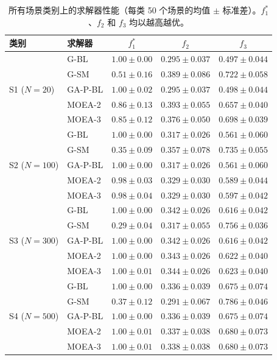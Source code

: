 \documentclass[preprint,12pt,authoryear]{elsarticle}
\begin{document}
\begin{table}[H]
\centering
\small
\caption{所有场景类别上的求解器性能（每类 50 个场景的均值 $\pm$ 标准差）。$f_1^*$、$f_2$ 和 $f_3$ 均以越高越优。}
\label{tab:solver-profiles}
\begin{tabular}{llccc}
\toprule
\textbf{类别} & \textbf{求解器} & $f_1^*$ & $f_2$ & $f_3$ \\
\midrule
\multirow{5}{*}{S1 ($N=20$)}
 & G-BL    & $1.00 \pm 0.00$ & $0.295 \pm 0.037$ & $0.497 \pm 0.044$ \\
 & G-SM    & $0.51 \pm 0.16$ & $0.389 \pm 0.086$ & $0.722 \pm 0.058$ \\
 & GA-P-BL & $1.00 \pm 0.02$ & $0.295 \pm 0.037$ & $0.498 \pm 0.044$ \\
 & MOEA-2  & $0.86 \pm 0.13$ & $0.393 \pm 0.055$ & $0.657 \pm 0.040$ \\
 & MOEA-3  & $0.85 \pm 0.12$ & $0.376 \pm 0.050$ & $0.698 \pm 0.039$ \\
\midrule
\multirow{5}{*}{S2 ($N=100$)}
 & G-BL    & $1.00 \pm 0.00$ & $0.317 \pm 0.026$ & $0.561 \pm 0.060$ \\
 & G-SM    & $0.35 \pm 0.09$ & $0.357 \pm 0.078$ & $0.735 \pm 0.055$ \\
 & GA-P-BL & $1.00 \pm 0.00$ & $0.317 \pm 0.026$ & $0.561 \pm 0.060$ \\
 & MOEA-2  & $0.98 \pm 0.03$ & $0.329 \pm 0.030$ & $0.589 \pm 0.044$ \\
 & MOEA-3  & $0.98 \pm 0.04$ & $0.329 \pm 0.030$ & $0.597 \pm 0.042$ \\
\midrule
\multirow{5}{*}{S3 ($N=300$)}
 & G-BL    & $1.00 \pm 0.00$ & $0.342 \pm 0.026$ & $0.616 \pm 0.042$ \\
 & G-SM    & $0.29 \pm 0.04$ & $0.317 \pm 0.055$ & $0.756 \pm 0.036$ \\
 & GA-P-BL & $1.00 \pm 0.00$ & $0.342 \pm 0.026$ & $0.616 \pm 0.042$ \\
 & MOEA-2  & $1.00 \pm 0.00$ & $0.343 \pm 0.026$ & $0.622 \pm 0.040$ \\
 & MOEA-3  & $1.00 \pm 0.01$ & $0.344 \pm 0.026$ & $0.623 \pm 0.040$ \\
\midrule
\multirow{5}{*}{S4 ($N=500$)}
 & G-BL    & $1.00 \pm 0.00$ & $0.336 \pm 0.039$ & $0.675 \pm 0.074$ \\
 & G-SM    & $0.37 \pm 0.12$ & $0.291 \pm 0.067$ & $0.786 \pm 0.046$ \\
 & GA-P-BL & $1.00 \pm 0.00$ & $0.336 \pm 0.039$ & $0.675 \pm 0.074$ \\
 & MOEA-2  & $1.00 \pm 0.01$ & $0.337 \pm 0.038$ & $0.680 \pm 0.073$ \\
 & MOEA-3  & $1.00 \pm 0.01$ & $0.338 \pm 0.038$ & $0.680 \pm 0.073$ \\
\bottomrule
\end{tabular}
\end{table}
\end{document}
